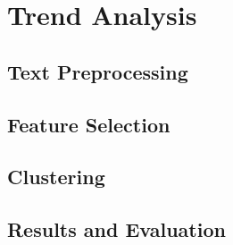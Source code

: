 \section{Trend Analysis}
\subsection{Text Preprocessing}
\subsection{Feature Selection}
\subsection{Clustering}
\subsection{Results and Evaluation}